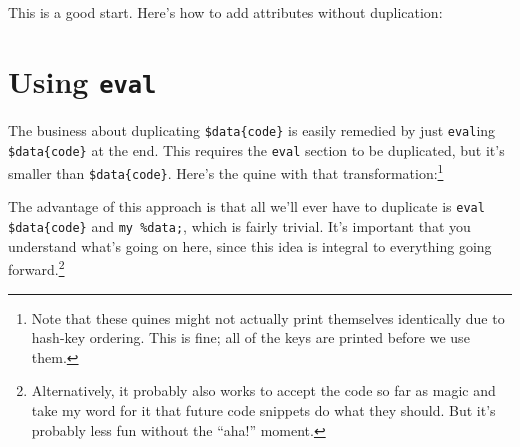 \documentclass{report}
\begin{document}

    \noindent This is a good start. Here's how to add attributes without duplication:


\section{Using {\tt eval}}\label{sec:using-eval}
    The business about duplicating \verb|$data{code}| is easily remedied by just {\tt eval}ing \verb|$data{code}| at the end. This requires the {\tt eval} section to be duplicated, but it's
    smaller than \verb|$data{code}|. Here's the quine with that transformation:\footnote{Note that these quines might not actually print themselves identically due to hash-key ordering. This
    is fine; all of the keys are printed before we use them.}


    \noindent The advantage of this approach is that all we'll ever have to duplicate is \verb|eval $data{code}| and \verb|my %data;|, which is fairly trivial. It's important that you
    understand what's going on here, since this idea is integral to everything going forward.\footnote{Alternatively, it probably also works to accept the code so far as magic and take my word
    for it that future code snippets do what they should. But it's probably less fun without the ``aha!'' moment.}
\end{document}
